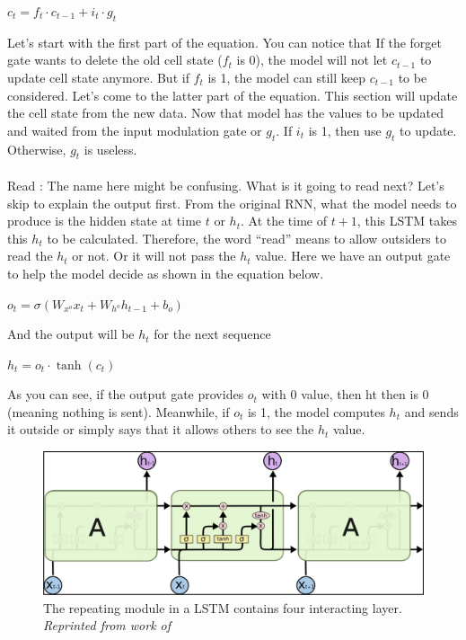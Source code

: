 \hfil $c_t = f_t \cdot c_{t-1} + i_t \cdot g_t $ \par 
Let's start with the first part of the equation. You can notice that If the forget gate wants to delete the old cell state ($f_t$ is 0), the model will not let $c_{t -1}$ to update cell state anymore. But if $f_t$ is 1, the model can still keep $c_{t -1}$ to be considered. Let’s come to the latter part of the equation. This section will update the cell state from the new data. Now that model has the values to be updated and waited from the input modulation gate or $g_t$. If $i_t$ is 1, then use $g_t$ to update. Otherwise, $g_t$ is useless.

\paragraph{}
Read : The name here might be confusing. What is it going to read next? Let's skip to explain the output first. From the original RNN, what the model needs to produce is the hidden state at time $t$ or $h_t$. At the time of $t+1$, this LSTM takes this $h_t$ to be calculated. Therefore, the word “read” means to allow outsiders to read the $h_t$ or not. Or it will not pass the $h_t$ value. Here we have an output gate to help the model decide as shown in the equation below. 

\hfil $ o_t = \sigma(W_{x^o}x_t + W_{h^o}h_{t-1} + b_o) $ \par 
And the output will be $h_t$ for the next sequence

\hfil $ h_t = o_t \cdot \tanh(c_t) $ \par 
As you can see, if the output gate provides $o_t$ with 0 value, then ht then is 0 (meaning nothing is sent). Meanwhile, if $o_t$ is 1, the model computes $h_t$ and sends it outside or simply says that it allows others to see the $h_t$ value.

\begin{figure}[H]
  \centering
  \caption[The repeating module in a LSTM contains four interacting layer.]{The repeating module in a LSTM contains four interacting layer. \\\hspace{\textwidth} \emph{Reprinted from work of \citeauthor{sirinart_tangruamsub_2017} \citeyear{sirinart_tangruamsub_2017}}}\label{fig:LSTM_2}
  \includegraphics[scale = 0.2]{figures/LSTM_2.jpg}  

\end{figure}

